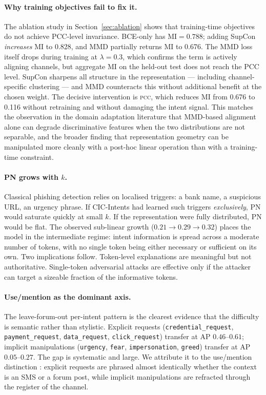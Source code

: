\documentclass[preprint,12pt,authoryear]{elsarticle}
\newcommand{\pcc}{\textsc{pcc}}
\begin{document}
\paragraph*{Why training objectives fail to fix it.} The ablation
study in Section~\ref{sec:ablation} shows that training-time
objectives do not achieve PCC-level invariance. BCE-only has
$\text{MI} = 0.788$; adding SupCon \emph{increases} MI to 0.828,
and MMD partially returns MI to 0.676. The MMD loss itself drops
during training at $\lambda=0.3$, which confirms the term is
actively aligning channels, but aggregate MI on the held-out test
does not reach the PCC level. SupCon sharpens all structure in the
representation --- including channel-specific clustering --- and
MMD counteracts this without additional benefit at the chosen
weight. The decisive intervention is \pcc{}, which reduces MI from
0.676 to 0.116 without retraining and without damaging the intent
signal. This matches the observation in the domain adaptation
literature that MMD-based alignment alone can degrade discriminative
features when the two distributions are not separable, and the
broader finding that representation geometry can be manipulated more
cleanly with a post-hoc linear operation than with a training-time
constraint.

\paragraph*{PN grows with $k$.} Classical phishing detection relies
on localised triggers: a bank name, a suspicious URL, an urgency
phrase. If CIC-Intents had learned such triggers \emph{exclusively},
PN would saturate quickly at small $k$. If the representation were
fully distributed, PN would be flat. The observed sub-linear growth
($0.21 \to 0.29 \to 0.32$) places the model in the intermediate
regime: intent information is spread across a moderate number of
tokens, with no single token being either necessary or sufficient on
its own. Two implications follow. Token-level explanations are
meaningful but not authoritative. Single-token adversarial attacks
are effective only if the attacker can target a sizeable fraction of
the informative tokens.

\paragraph*{Use/mention as the dominant axis.} The leave-forum-out
per-intent pattern is the clearest evidence that the difficulty is
semantic rather than stylistic. Explicit requests
(\texttt{credential\_request}, \texttt{payment\_request},
\texttt{data\_request}, \texttt{click\_request}) transfer at AP
$0.46$--$0.61$; implicit manipulations (\texttt{urgency},
\texttt{fear}, \texttt{impersonation}, \texttt{greed}) transfer at
AP $0.05$--$0.27$. The gap is systematic and large. We attribute it
to the use/mention distinction \citep{gligoric2024use}: explicit
requests are phrased almost identically whether the context is an
SMS or a forum post, while implicit manipulations are refracted
through the register of the channel.
\end{document}
